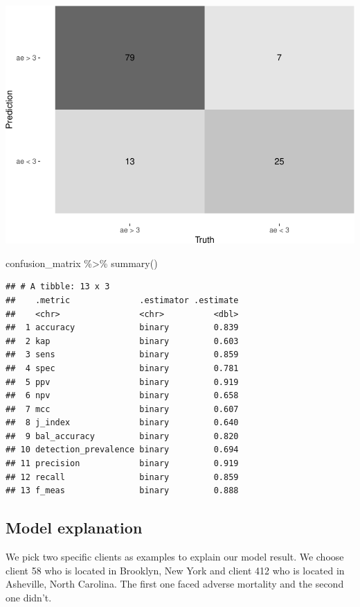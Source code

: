 \documentclass[
]{article}
\newenvironment{Shaded}{\begin{snugshade}}{\end{snugshade}}
\newcommand{\FunctionTok}[1]{\textcolor[rgb]{0.00,0.00,0.00}{#1}}
\newcommand{\NormalTok}[1]{#1}
\newcommand{\SpecialCharTok}[1]{\textcolor[rgb]{0.00,0.00,0.00}{#1}}
\begin{document}
\includegraphics{figures/report/fig-unnamed-chunk-26-1.pdf}

\begin{Shaded}
\begin{Highlighting}[]
\NormalTok{confusion\_matrix }\SpecialCharTok{\%\textgreater{}\%} \FunctionTok{summary}\NormalTok{()}
\end{Highlighting}
\end{Shaded}

\begin{verbatim}
## # A tibble: 13 x 3
##    .metric              .estimator .estimate
##    <chr>                <chr>          <dbl>
##  1 accuracy             binary         0.839
##  2 kap                  binary         0.603
##  3 sens                 binary         0.859
##  4 spec                 binary         0.781
##  5 ppv                  binary         0.919
##  6 npv                  binary         0.658
##  7 mcc                  binary         0.607
##  8 j_index              binary         0.640
##  9 bal_accuracy         binary         0.820
## 10 detection_prevalence binary         0.694
## 11 precision            binary         0.919
## 12 recall               binary         0.859
## 13 f_meas               binary         0.888
\end{verbatim}

\hypertarget{model-explanation}{%
\subsection{Model explanation}\label{model-explanation}}

We pick two specific clients as examples to explain our model result. We
choose client 58 who is located in Brooklyn, New York and client 412 who
is located in Asheville, North Carolina. The first one faced adverse
mortality and the second one didn't.
\end{document}

